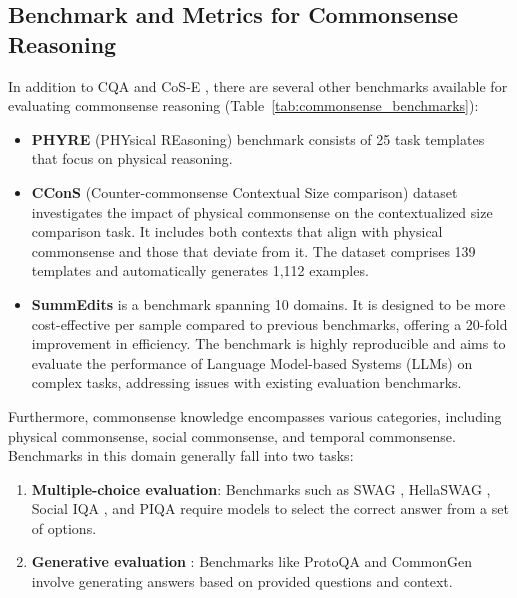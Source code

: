 \usepackage{amsmath}  %
\usepackage{natbib}   %

\subsection{Benchmark and Metrics for Commonsense Reasoning}

In addition to CQA \citep{Talmor2019} and CoS-E \citep{Rajani2019}, there are several other benchmarks available for evaluating commonsense reasoning (Table~\ref{tab:commonsense_benchmarks}):

\begin{itemize}
    \item \textbf{PHYRE} (PHYsical REasoning) benchmark \citep{Bakhtin2019} consists of 25 task templates that focus on physical reasoning.
    
    \item \textbf{CConS} (Counter-commonsense Contextual Size comparison) dataset \citep{Kondo2023} investigates the impact of physical commonsense on the contextualized size comparison task. It includes both contexts that align with physical commonsense and those that deviate from it. The dataset comprises 139 templates and automatically generates 1,112 examples.
    
    \item \textbf{SummEdits} \citep{Laban2023} is a benchmark spanning 10 domains. It is designed to be more cost-effective per sample compared to previous benchmarks, offering a 20-fold improvement in efficiency. The benchmark is highly reproducible and aims to evaluate the performance of Language Model-based Systems (LLMs) on complex tasks, addressing issues with existing evaluation benchmarks.
\end{itemize}

Furthermore, commonsense knowledge encompasses various categories, including physical commonsense, social commonsense, and temporal commonsense. Benchmarks in this domain generally fall into two tasks:

\begin{enumerate}
    \item \textbf{Multiple-choice evaluation}: Benchmarks such as SWAG \citep{Zellers2018}, HellaSWAG \citep{Zellers2019}, Social IQA \citep{Sap2019}, and PIQA \citep{Bisk2020} require models to select the correct answer from a set of options.
    
    \item \textbf{Generative evaluation} \citep{Lin2020a}: Benchmarks like ProtoQA \citep{Boratko2020} and CommonGen \citep{Lin2020b} involve generating answers based on provided questions and context.
\end{enumerate}

